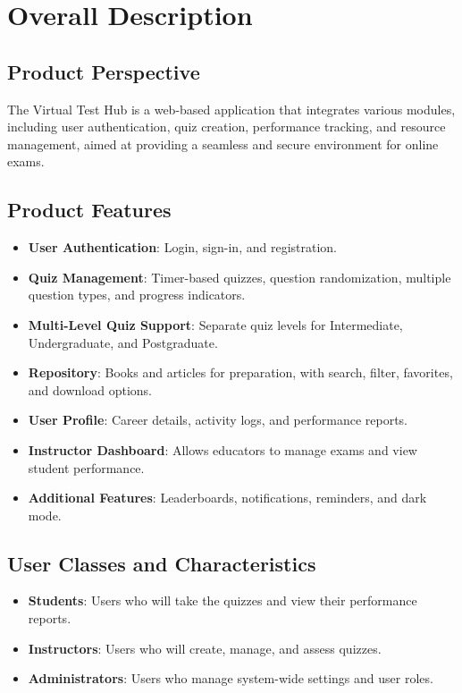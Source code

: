 \documentclass{article}
\begin{document}
	\section{Overall Description}
	
	\subsection{Product Perspective}
	The Virtual Test Hub is a web-based application that integrates various modules, including user authentication, quiz creation, performance tracking, and resource management, aimed at providing a seamless and secure environment for online exams.
	
	\subsection{Product Features}
	\begin{itemize}
		\item \textbf{User Authentication}: Login, sign-in, and registration.
		\item \textbf{Quiz Management}: Timer-based quizzes, question randomization, multiple question types, and progress indicators.
		\item \textbf{Multi-Level Quiz Support}: Separate quiz levels for Intermediate, Undergraduate, and Postgraduate.
		\item \textbf{Repository}: Books and articles for preparation, with search, filter, favorites, and download options.
		\item \textbf{User Profile}: Career details, activity logs, and performance reports.
		\item \textbf{Instructor Dashboard}: Allows educators to manage exams and view student performance.
		\item \textbf{Additional Features}: Leaderboards, notifications, reminders, and dark mode.
	\end{itemize}
	
	\subsection{User Classes and Characteristics}
	\begin{itemize}
		\item \textbf{Students}: Users who will take the quizzes and view their performance reports.
		\item \textbf{Instructors}: Users who will create, manage, and assess quizzes.
		\item \textbf{Administrators}: Users who manage system-wide settings and user roles.
	\end{itemize}
	
\end{document}
